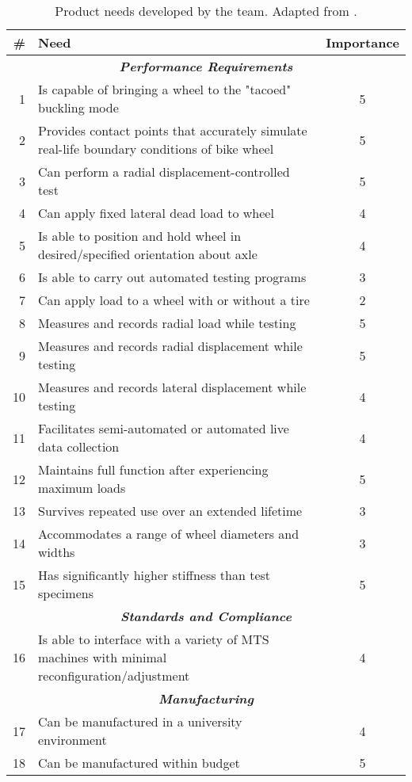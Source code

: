 \documentclass[\rootdir/thesis.tex]{subfiles}
\begin{document}
\begin{table}
\caption[Product Needs for the bicycle wheel tester]{Product needs developed by the team. Adapted from \cite{WheelCats2018}.}
\label{tab:wheelcats_needs}
\begin{tabularx}{\linewidth}{r|Xc}
\toprule
\bf{\#}& \bf{Need}& \bf{Importance}\\
\midrule
\multicolumn{3}{c}{\emph{\textbf{Performance Requirements}}}\\
\midrule
1 & Is capable of bringing a wheel to the "tacoed" buckling mode& 5\\
2 & Provides contact points that accurately simulate real-life boundary conditions of bike wheel& 5\\
3 & Can perform a radial displacement-controlled test& 5\\
4 & Can apply fixed lateral dead load to wheel& 4\\
5 & Is able to position and hold wheel in desired/specified orientation about axle& 4\\
6 & Is able to carry out automated testing programs& 3\\
7 & Can apply load to a wheel with or without a tire& 2\\
8 & Measures and records radial load while testing& 5\\
9 & Measures and records radial displacement while testing& 5\\
10& Measures and records lateral displacement while testing& 4\\
11& Facilitates semi-automated or automated live data collection& 4\\
12& Maintains full function after experiencing maximum loads& 5\\
13& Survives repeated use over an extended lifetime& 3\\
14& Accommodates a range of wheel diameters and widths& 3\\
15& Has significantly higher stiffness than test specimens& 5\\
\midrule
\multicolumn{3}{c}{\emph{\textbf{Standards and Compliance}}}\\
\midrule
16& Is able to interface with a variety of MTS machines with minimal reconfiguration/adjustment& 4\\
\midrule
\multicolumn{3}{c}{\emph{\textbf{Manufacturing}}}\\
\midrule
17& Can be manufactured in a university environment& 4\\
18& Can be manufactured within budget& 5\\

\end{tabularx}
\end{table}
\end{document}
